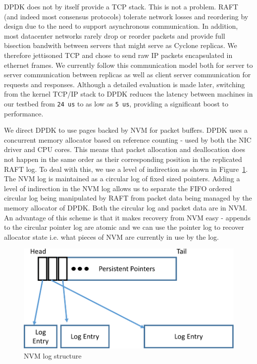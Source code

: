\documentclass[pageno]{jpaper}
\begin{document}
DPDK does not by itself provide a TCP stack. This is not a problem. RAFT (and
indeed most consensus protocols) tolerate network losses and reordering by
design due to the need to support asynchronous communication. In addition, most
datacenter networks rarely drop or reorder packets and provide full bisection
bandwith between servers that might serve as Cyclone replicas. We therefore
jettisoned TCP and chose to send raw IP packets encapsulated in ethernet
frames. We currently follow this communication model both for server to server
communication between replicas as well as client server communication for
requests and responses. Although a detailed evaluation is made later, switching
from the kernel TCP/IP stack to DPDK reduces the latency between machines in our
testbed from {\tt 24 us} to as low as {\tt 5 us}, providing a significant boost
to performance.

We direct DPDK to use pages backed by NVM for packet buffers. DPDK uses a
concurrent memory allocator based on reference counting - used by both the NIC
driver and CPU cores. This means that packet allocation and deallocation does
not happen in the same order as their corresponding position in the replicated
RAFT log. To deal with this, we use a level of indirection as shown in
Figure~\ref{fig:nvm_log}. The NVM log is maintained as a circular log of fixed
sized pointers. Adding a level of indirection in the NVM log allows us to
separate the FIFO ordered circular log being manipulated by RAFT from packet
data being managed by the memory allocator of DPDK. Both the circular log and
packet data are in NVM. An advantage of this scheme is that it makes recovery
from NVM easy - appends to the circular pointer log are atomic and we can use
the pointer log to recover allocator state i.e. what pieces of NVM are currently
in use by the log.

\begin{figure}
\centering
\includegraphics[scale=0.3]{figures2/nvm_log.pdf}
\caption{NVM log structure}
\label{fig:nvm_log}
\end{figure}
\end{document}

